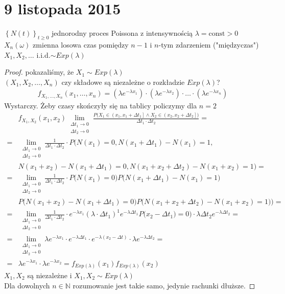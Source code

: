 \chapter{9 listopada 2015}

$ \left\{N(t)\right\}_{t\ge0} $ jednorodny proces Poissona z intensywnością $ \lambda=\text{const}>0 $\\
$ X_n(\omega) $ zmienna losowa czas pomiędzy $ n-1 $ i $ n $-tym zdarzeniem ("międzyczas")\\
$ X_1,X_2,\dots $ i.i.d.$ \sim Exp(\lambda) $

\begin{proof}
pokazaliśmy, że $ X_1\sim Exp(\lambda) $\\
$ (X_1,X_2,\dots,X_n) $ czy składowe są niezależne o rozkładzie $ Exp(\lambda) $?
\begin{gather*}
f_{X_1,\dots,X_n}(x_1,\dots,x_n)=
\left(\lambda e^{-\lambda x_1}\right)\cdot
\left(\lambda e^{-\lambda x_2}\right)
\cdot\dots\cdot
\left(\lambda e^{-\lambda x_n}\right)
\end{gather*}
Wystarczy. Żeby czasy skończyły się na tablicy policzymy dla $ n=2 $
\begin{align*}
&f_{X_1,X_2}(x_1,x_2)\lim\limits_{\substack{\Delta t_1\to0\\\Delta t_2\to0}}
\frac{P\bigl(
X_1\in \left(x_1,x_1+\Delta t_1\right]\wedge
X_2\in \left(x_2,x_2+\Delta t_2\right]\bigr)}{\Delta t_1\cdot \Delta t_2}
=\\=&
\lim\limits_{\substack{\Delta t_1\to0\\\Delta t_2\to0}}
\frac{1}{\Delta t_1\cdot \Delta t_2}\cdot
P\bigl(
N(x_1)=0,
N(x_1+\Delta t_1)-N(x_1)=1,\\&
N(x_1+x_2)-N(x_1+\Delta t_1)=0,
N(x_1+x_2+\Delta t_2)-N(x_1+x_2)=1
\bigr)
=\\=&
\lim\limits_{\substack{\Delta t_1\to0\\\Delta t_2\to0}}
\frac{1}{\Delta t_1\cdot \Delta t_2}\cdot
P\bigl(
N(x_1)=0\bigr)P\bigl(
N(x_1+\Delta t_1)-N(x_1)=1\bigr)\\&
P\bigl(N(x_1+x_2)-N(x_1+\Delta t_1)=0\bigr)
P\bigl(N(x_1+x_2+\Delta t_2)-N(x_1+x_2)=1
\bigr)
\bigr)
=\\=&
\lim\limits_{\substack{\Delta t_1\to0\\\Delta t_2\to0}}
\frac{1}{\Delta t_1\cdot \Delta t_2}\cdot
e^{-\lambda x_1}(\lambda\cdot \Delta t_1)^1e^{-\lambda \Delta t_1}P\bigl(x_2-\Delta t_1)=0\bigr)\cdot\lambda\Delta t_2 e^{-\lambda\Delta t_2}
=\\=&
\lim\limits_{\substack{\Delta t_1\to0\\\Delta t_2\to0}}
\lambda e^{-\lambda x_1}\cdot
e^{-\lambda \Delta t_1}\cdot
e^{-\lambda (x_2-\Delta t)}\cdot
\lambda e^{-\lambda \Delta t_2}
=\\=&
\lambda e^{-\lambda x_1}\cdot\lambda e^{-\lambda x_2}
=
f_{Exp(\lambda)}(x_1)
f_{Exp(\lambda)}(x_2)
\end{align*}	
$ X_1,X_2 $ są niezależne i $ X_1,X_2\sim Exp(\lambda) $\\
Dla dowolnych $ n\in \mathbb{N} $ rozumowanie jest takie samo, jedynie rachunki dłuższe.
\end{proof}

